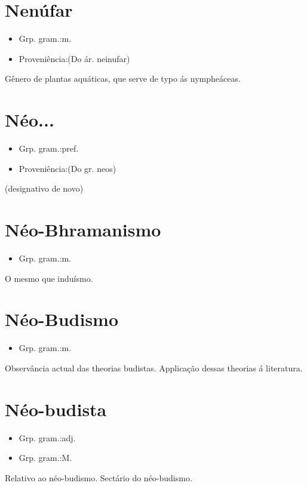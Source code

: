 \section{Nenúfar}
\begin{itemize}
\item {Grp. gram.:m.}
\end{itemize}
\begin{itemize}
\item {Proveniência:(Do ár. \textunderscore neinufar\textunderscore )}
\end{itemize}
Gênero de plantas aquáticas, que serve de typo ás nympheáceas.
\section{Néo...}
\begin{itemize}
\item {Grp. gram.:pref.}
\end{itemize}
\begin{itemize}
\item {Proveniência:(Do gr. \textunderscore neos\textunderscore )}
\end{itemize}
(designativo de \textunderscore novo\textunderscore )
\section{Néo-Bhramanismo}
\begin{itemize}
\item {Grp. gram.:m.}
\end{itemize}
O mesmo que \textunderscore induísmo\textunderscore .
\section{Néo-Budismo}
\begin{itemize}
\item {Grp. gram.:m.}
\end{itemize}
Observância actual das theorias budistas.
Applicação dessas theorias á literatura.
\section{Néo-budista}
\begin{itemize}
\item {Grp. gram.:adj.}
\end{itemize}
\begin{itemize}
\item {Grp. gram.:M.}
\end{itemize}
Relativo ao néo-budismo.
Sectário do néo-budismo.
